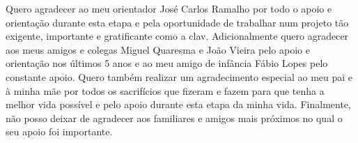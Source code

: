 Quero agradecer ao meu orientador José Carlos Ramalho por todo o apoio e orientação durante esta etapa e pela oportunidade de trabalhar num projeto tão exigente, importante e gratificante como a \acrshort{clav}. Adicionalmente quero agradecer aos meus amigos e colegas Miguel Quaresma e João Vieira pelo apoio e orientação nos últimos 5 anos e ao meu amigo de infância Fábio Lopes pelo constante apoio. Quero também realizar um agradecimento especial ao meu pai e à minha mãe por todos os sacrifícios que fizeram e fazem para que tenha a melhor vida possível e pelo apoio durante esta etapa da minha vida. Finalmente, não posso deixar de agradecer aos familiares e amigos mais próximos no qual o seu apoio foi importante.
